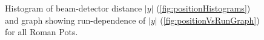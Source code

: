 \begin{figure}[hb]
\centering
\parbox{0.4\textwidth}{
  \centering
  \begin{subfigure}[b]{\linewidth}{
                }
  \end{subfigure}
}
\quad
\parbox{0.545\textwidth}{
  \centering
  \begin{subfigure}[b]{\linewidth}{
                }
  \end{subfigure}
}%
\caption[Beam-detector distance of the Roman Pots in run 15.]{Histogram of beam-detector distance $|y|$ (\ref{fig:positionHistograms}) and graph showing run-dependence of $|y|$ (\ref{fig:positionVsRunGraph}) for all Roman Pots.}%
\end{figure}
